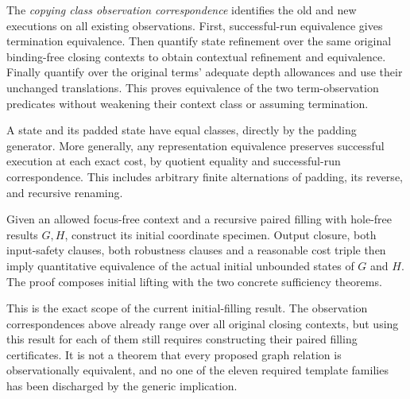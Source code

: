 The \emph{copying class observation correspondence} identifies the old and
new executions on all existing observations. First, successful-run equivalence
gives termination equivalence. Then quantify state refinement over the same
original binding-free closing contexts to obtain contextual refinement and
equivalence. Finally quantify over the original terms' adequate depth
allowances and use their unchanged translations. This proves equivalence
of the two term-observation predicates without weakening their context class
or assuming termination.





A state and its padded state have equal classes, directly by the padding
generator. More generally, any representation equivalence preserves successful
execution at each exact cost, by quotient equality and successful-run
correspondence. This includes arbitrary finite alternations of padding,
its reverse, and recursive renaming.



Given an allowed focus-free context and a recursive paired filling with
hole-free results $G,H$, construct its initial coordinate specimen. Output
closure, both input-safety clauses, both robustness clauses and a reasonable
cost triple then imply quantitative equivalence of the actual initial
unbounded states of $G$ and $H$. The proof composes initial lifting with the
two concrete sufficiency theorems.

This is the exact scope of the current initial-filling result. The observation
correspondences above already range over all original closing contexts, but
using this result for each of them still requires constructing their paired
filling certificates. It is not a theorem that every proposed graph relation
is observationally equivalent, and no one of the eleven required template
families has been discharged by the generic implication.

